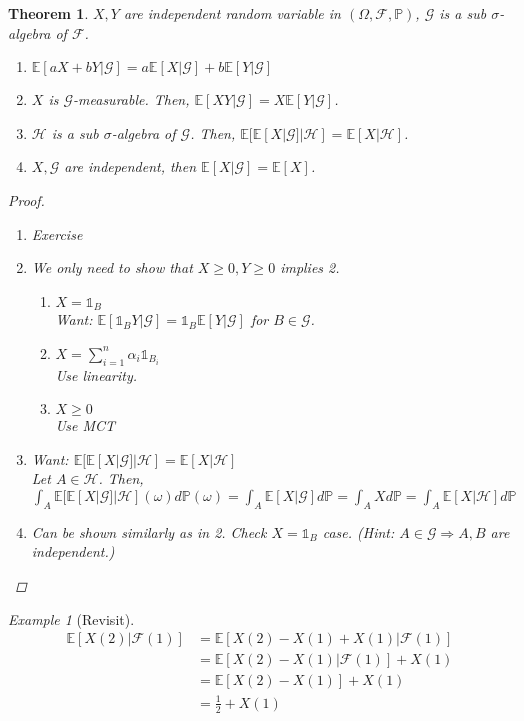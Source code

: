 \documentclass[12pt]{report}
\renewcommand{\P}{\mathbb{P}}
\newcommand{\F}{\mathcal{F}}
\newcommand{\E}{\mathbb{E}}
\renewcommand{\1}{\mathbb{1}}
\renewcommand{\O}{\Omega}
\theoremstyle{break}
\newtheorem{thm}{Theorem}[section] %
\theoremstyle{newdef}
\theoremstyle{remark}
\newtheorem*{exmp}{Example} %
\begin{document}
\begin{thm}
$X, Y$ are independent random variable in $(\O,\F,\P)$, $\mathcal{G}$ is a sub $\sigma$-algebra of $\F$.
\begin{enumerate}
\item $\E[aX + bY | \mathcal{G}] = a\E[X|\mathcal{G}] + b\E[Y|\mathcal{G}]$
\item $X$ is $\mathcal{G}$-measurable.
Then, $\E[XY|\mathcal{G}] = X\E[Y|\mathcal{G}]$.
\item $\mathcal{H}$ is a sub $\sigma$-algebra of $\mathcal{G}$. Then,
$\E[\E[X|\mathcal{G}]|\mathcal{H}] = \E[X|\mathcal{H}]$.
\item $X, \mathcal{G}$ are independent, then $\E[X|\mathcal{G}] = \E[X]$.
\end{enumerate}

\begin{proof}
\begin{enumerate}
\item Exercise

\item We only need to show that $X \geq 0, Y \geq 0$ implies 2.
\begin{enumerate}
\item $X = \1_B$\\
Want: $\E[\1_B Y | \mathcal{G}] = \1_B \E[Y | \mathcal{G}]$ for $B \in \mathcal{G}$.

\item $X = \sum_{i=1}^n \alpha_i \1_{B_i}$\\
Use linearity.

\item $X \geq 0$\\
Use MCT

\end{enumerate}

\item Want: $\E[\E[X|\mathcal{G}]|\mathcal{H}] = \E[X|\mathcal{H}]$\\
Let $A \in \mathcal{H}$.
Then, $\int_A \E[\E[X|\mathcal{G}]|\mathcal{H}](\omega) d\P(\omega)
= \int_A \E[X|\mathcal{G}] d\P
= \int_A Xd\P
= \int_A \E[X|\mathcal{H}]d\P$

\item Can be shown similarly as in 2.
Check $X = \1_B$ case. (Hint: $A \in \mathcal{G} \Rightarrow A, B$ are independent.)
\end{enumerate}
\end{proof}
\end{thm}


\begin{exmp}[Revisit]
$$
\begin{aligned}
\E[X(2) | \F(1)]
&= \E[X(2) - X(1) + X(1) | \F(1)]\\
&= \E[X(2) - X(1) | \F(1)] + X(1)\\
&= \E[X(2) - X(1)] + X(1)\\
&= \frac{1}{2} + X(1)
\end{aligned}
$$
\end{exmp}
\end{document}
